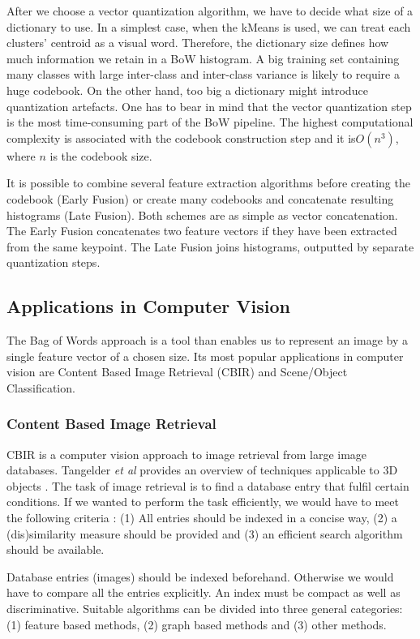 \documentclass[11pt,twoside]{article}
\begin{document}
    After we choose a vector quantization algorithm, we have to decide what size of a dictionary to use. In a simplest case, when the kMeans is used, we can treat each clusters' centroid as a visual word. Therefore, the dictionary size defines how much information we retain in a BoW histogram. A big training set containing many classes with large inter-class and inter-class variance is likely to require a huge codebook. On the other hand, too big a dictionary might introduce quantization artefacts. One has to bear in mind that the vector quantization step is the most time-consuming part of the BoW pipeline. The highest computational complexity is associated with the codebook construction step and it is$O(n^3)$, where $n$ is the codebook size.		
    
    It is possible to combine several feature extraction algorithms before creating the codebook (Early Fusion) or create many codebooks and concatenate resulting histograms (Late Fusion). Both schemes are as simple as vector concatenation. The Early Fusion concatenates two feature vectors if they have been extracted from the same keypoint. The Late Fusion joins histograms, outputted by separate quantization steps.

  \subsection{Applications in Computer Vision}
    The Bag of Words approach is a tool than enables us to represent an image by a single feature vector of a chosen size. Its most popular applications in computer vision are Content Based Image Retrieval (CBIR) and Scene/Object Classification.

  \subsubsection{Content Based Image Retrieval}
    CBIR is a computer vision approach to image retrieval from large image databases. Tangelder \emph{et al} provides an overview of techniques applicable to 3D objects \cite{tangelder2008survey}. The task of image retrieval is to find a database entry that fulfil certain conditions. If we wanted to perform the task efficiently, we would have to meet the following criteria \cite{toldo2009bag}: (1) All entries should be indexed in a concise way, (2) a (dis)similarity measure should be provided and (3) an efficient search algorithm should be available. 
    
    Database entries (images) should be indexed beforehand. Otherwise we would have to compare all the entries explicitly. An index must be compact as well as discriminative. Suitable algorithms can be divided into three general categories: (1) feature based methods, (2) graph based methods and (3) other methods.
\end{document}

